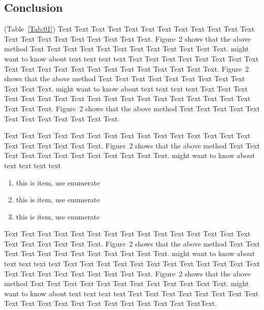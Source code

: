 \documentclass{bioinfo}
\begin{document}
\begin{methods}
%
%






\section{Conclusion}

(Table~\ref{Tab:01}) Text Text Text Text Text Text  Text Text Text
Text Text Text Text Text Text  Text Text Text Text Text Text.
Figure~2\vphantom{\ref{fig:02}} shows that the above method  Text
Text Text Text  Text Text Text Text Text Text  Text Text.
\citealp{Boffelli03} might want to know about  text text text text
Text Text Text Text Text Text  Text Text Text Text Text Text Text
Text Text  Text Text Text Text Text Text.
Figure~2\vphantom{\ref{fig:02}} shows that the above method  Text
Text Text Text  Text Text Text Text Text Text  Text Text.
\citealp{Boffelli03} might want to know about  text text text text
Text Text Text Text Text Text Text Text Text Text Text Text Text
Text Text  Text Text Text Text Text Text.
Figure~2\vphantom{\ref{fig:02}} shows that the above method  Text
Text Text Text  Text Text Text Text Text Text  Text Text.



Text Text Text Text Text Text  Text Text Text Text Text Text Text
Text Text  Text Text Text Text Text Text.
Figure~2\vphantom{\ref{fig:02}} shows that the above method  Text
Text Text Text  Text Text Text Text Text Text  Text Text.
\citealp{Boffelli03} might want to know about  text text text text

\begin{enumerate}
\item this is item, use enumerate
\item this is item, use enumerate
\item this is item, use enumerate
\end{enumerate}

Text Text Text Text Text Text Text Text Text Text Text Text Text
Text Text Text Text Text Text Text Text.
Figure~2\vphantom{\ref{fig:02}} shows\vadjust{\pagebreak} that the
above method  Text Text Text Text Text Text Text Text Text Text
Text Text.  \citealp{Boffelli03} might want to know about text
text text text Text Text Text Text Text Text  Text Text Text Text
Text Text Text Text Text Text Text Text Text Text Text.
Figure~2\vphantom{\ref{fig:02}} shows that the above method  Text
Text Text Text Text Text Text Text Text Text  Text Text.
\citealp{Boffelli03} might want to know about text text text text
Text Text Text Text Text Text  Text Text Text Text Text Text Text
Text Text Text Text Text Text Text\break Text.



\end{methods}
\end{document}
